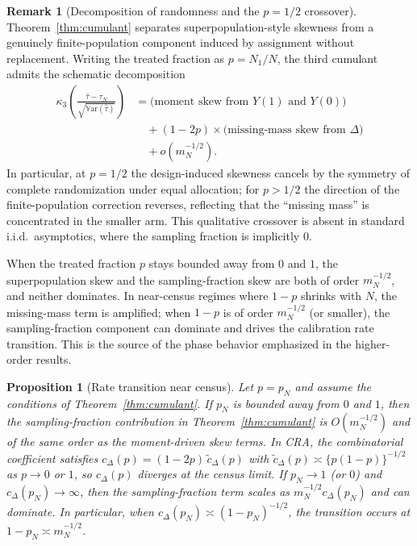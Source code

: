 \documentclass[aos]{imsart}
\newtheorem{proposition}{Proposition}
\theoremstyle{definition}
\newtheorem{remark}{Remark}
\theoremstyle{plain}
\newcommand{\Var}{\mathbb{V}\mathrm{ar}}
\newcommand{\mN}{m_N}
\begin{document}
\begin{remark}[Decomposition of randomness and the $p=1/2$ crossover]\label{rem:decomp_randomness}
Theorem~\ref{thm:cumulant} separates superpopulation-style skewness from a genuinely finite-population component induced by assignment without replacement. Writing the treated fraction as $p=N_1/N$, the third cumulant admits the schematic decomposition
\[
\begin{aligned}
\kappa_3\!\left(\frac{\hat\tau-\tau_N}{\sqrt{\Var(\hat\tau)}}\right)
&=\text{(moment skew from }Y(1)\text{ and }Y(0)\text{)} \\
&\quad + (1-2p)\times\text{(missing-mass skew from }\Delta\text{)} \\
&\quad + o(m_N^{-1/2}).
\end{aligned}
\]
In particular, at $p=1/2$ the design-induced skewness cancels by the symmetry of complete randomization under equal allocation; for $p>1/2$ the direction of the finite-population correction reverses, reflecting that the ``missing mass'' is concentrated in the smaller arm. This qualitative crossover is absent in standard i.i.d.\ asymptotics, where the sampling fraction is implicitly $0$.
\end{remark}

When the treated fraction $p$ stays bounded away from $0$ and $1$, the superpopulation skew
and the sampling-fraction skew are both of order $\mN^{-1/2}$, and neither dominates.
In near-census regimes where $1-p$ shrinks with $N$, the missing-mass term is amplified;
when $1-p$ is of order $\mN^{-1/2}$ (or smaller), the sampling-fraction component can
dominate and drives the calibration rate transition. This is the source of the phase
behavior emphasized in the higher-order results.

\begin{proposition}[Rate transition near census]\label{prop:rate_transition}
Let $p=p_N$ and assume the conditions of Theorem~\ref{thm:cumulant}. If $p_N$ is bounded away from $0$ and $1$, then the
sampling-fraction contribution in Theorem~\ref{thm:cumulant} is $O(\mN^{-1/2})$ and of the same order as the moment-driven
skew terms. In CRA, the combinatorial coefficient satisfies $c_\Delta(p)=(1-2p)\,\tilde c_\Delta(p)$ with
$\tilde c_\Delta(p)\asymp \{p(1-p)\}^{-1/2}$ as $p\to 0$ or $1$, so $c_\Delta(p)$ diverges at the census limit.
If $p_N\to 1$ (or $0$) and $c_\Delta(p_N)\to\infty$, then the sampling-fraction term scales as
$\mN^{-1/2}c_\Delta(p_N)$ and can dominate. In particular, when $c_\Delta(p_N)\asymp (1-p_N)^{-1/2}$, the transition occurs
at $1-p_N\asymp \mN^{-1/2}$.
\end{proposition}
\end{document}
